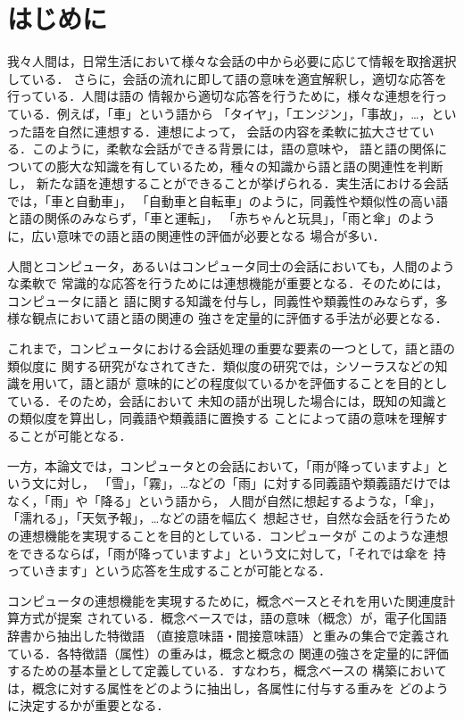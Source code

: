 \documentclass[japanese]{jnlp_1.3e}
\begin{document}
\maketitle


\section{はじめに}
我々人間は，日常生活において様々な会話の中から必要に応じて情報を取捨選択している．
さらに，会話の流れに即して語の意味を適宜解釈し，適切な応答を行っている．人間は語の
情報から適切な応答を行うために，様々な連想を行っている\cite{yoshimura2006}．例えば，「車」という語から
「タイヤ」，「エンジン」，「事故」，…，といった語を自然に連想する．連想によって，
会話の内容を柔軟に拡大させている．このように，柔軟な会話ができる背景には，語の意味や，
語と語の関係についての膨大な知識を有しているため，種々の知識から語と語の関連性を判断し，
新たな語を連想することができることが挙げられる．実生活における会話では，「車と自動車」，
「自動車と自転車」のように，同義性や類似性の高い語と語の関係のみならず，「車と運転」，
「赤ちゃんと玩具」，「雨と傘」のように，広い意味での語と語の関連性の評価が必要となる
場合が多い．

人間とコンピュータ，あるいはコンピュータ同士の会話においても，人間のような柔軟で
常識的な応答を行うためには連想機能が重要となる．そのためには，コンピュータに語と
語に関する知識を付与し，同義性や類義性のみならず，多様な観点において語と語の関連の
強さを定量的に評価する手法が必要となる．

これまで，コンピュータにおける会話処理の重要な要素の一つとして，語と語の類似度に
関する研究がなされてきた．類似度の研究では，シソーラスなどの知識を用いて，語と語が
意味的にどの程度似ているかを評価することを目的としている\cite{kasahara1997}．そのため，会話において
未知の語が出現した場合には，既知の知識との類似度を算出し，同義語や類義語に置換する
ことによって語の意味を理解することが可能となる．

一方，本論文では，コンピュータとの会話において，「雨が降っていますよ」という文に対し，
「雪」，「霧」，…などの「雨」に対する同義語や類義語だけではなく，「雨」や「降る」という語から，
人間が自然に想起するような，「傘」，「濡れる」，「天気予報」，…などの語を幅広く
想起させ，自然な会話を行うための連想機能を実現することを目的としている．コンピュータが
このような連想をできるならば，「雨が降っていますよ」という文に対して，「それでは傘を
持っていきます」という応答を生成することが可能となる．

コンピュータの連想機能を実現するために，概念ベースとそれを用いた関連度計算方式が提案
されている\cite{kojima2004,watabe2001,watabe2006}．概念ベースでは，語の意味（概念）が，電子化国語辞書から抽出した特徴語
（直接意味語・間接意味語）と重みの集合で定義されている．各特徴語（属性）の重みは，概念と概念の
関連の強さを定量的に評価するための基本量として定義している．すなわち，概念ベースの
構築においては，概念に対する属性をどのように抽出し，各属性に付与する重みを
どのように決定するかが重要となる．
\end{document}

